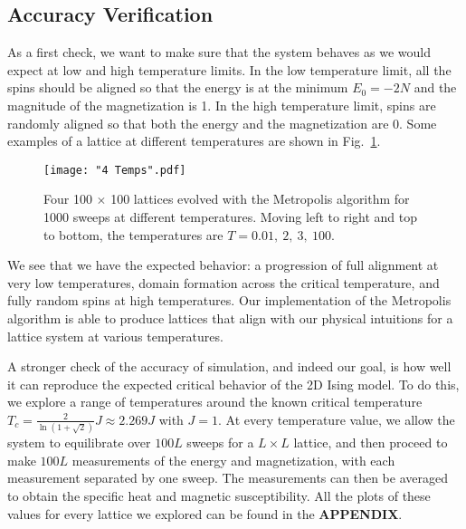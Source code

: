 \documentclass[twocolumn,aps,prl]{revtex4-1} %
\begin{document}
\subsection{Accuracy Verification}
As a first check, we want to make sure that the system behaves as we would expect at low and high temperature limits. In the low temperature limit, all the spins should be aligned so that the energy is at the minimum $E_0 = -2N$ and the magnitude of the magnetization is 1. In the high temperature limit, spins are randomly aligned so that both the energy and the magnetization are 0. Some examples of a lattice at different temperatures are shown in Fig.~\ref{fig:4temps}. 
\begin{figure}
	\texttt{[image: "4 Temps".pdf]}
	\caption{\label{fig:4temps} Four 100 $\times$ 100 lattices evolved with the Metropolis algorithm for 1000 sweeps at different temperatures. Moving left to right and top to bottom, the temperatures are $T = 0.01,\ 2,\ 3,\ 100$.}
\end{figure}

We see that we have the expected behavior: a progression of full alignment at very low temperatures, domain formation across the critical temperature, and fully random spins at high temperatures. Our implementation of the Metropolis algorithm is able to produce lattices that align with our physical intuitions for a lattice system at various temperatures.

A stronger check of the accuracy of simulation, and indeed our goal, is how well it can reproduce the expected critical behavior of the 2D Ising model. To do this, we explore a range of temperatures around the known critical temperature $T_c = \frac{2}{\ln(1+\sqrt{2})}J \approx 2.269J$ with $J = 1$. At every temperature value, we allow the system to equilibrate over $100L$ sweeps for a $L \times L$ lattice, and then proceed to make $100L$ measurements of the energy and magnetization, with each measurement separated by one sweep. The measurements can then be averaged to obtain the specific heat and magnetic susceptibility. All the plots of these values for every lattice we explored can be found in the \textbf{APPENDIX}.
\end{document}
